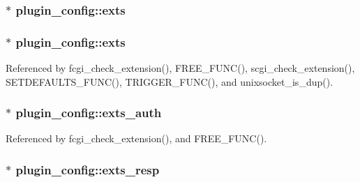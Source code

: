 \hypertarget{structplugin__config_a3c99102cf9e1d5708770d15369a08345}{
\subsubsection[{exts}]{$\ast$ plugin\-\_\-config\-::exts}}\label{structplugin__config_a3c99102cf9e1d5708770d15369a08345}
\hypertarget{structplugin__config_a4cbbd40f15c0c67bb1a2baf2ee1ed25d}{
\subsubsection[{exts}]{$\ast$ plugin\-\_\-config\-::exts}}\label{structplugin__config_a4cbbd40f15c0c67bb1a2baf2ee1ed25d}


Referenced by fcgi\-\_\-check\-\_\-extension(), F\-R\-E\-E\-\_\-\-F\-U\-N\-C(), scgi\-\_\-check\-\_\-extension(), S\-E\-T\-D\-E\-F\-A\-U\-L\-T\-S\-\_\-\-F\-U\-N\-C(), T\-R\-I\-G\-G\-E\-R\-\_\-\-F\-U\-N\-C(), and unixsocket\-\_\-is\-\_\-dup().

\hypertarget{structplugin__config_a940622b14c8268283bdc21ba4823cd4b}{
\subsubsection[{exts\-\_\-auth}]{$\ast$ plugin\-\_\-config\-::exts\-\_\-auth}}\label{structplugin__config_a940622b14c8268283bdc21ba4823cd4b}


Referenced by fcgi\-\_\-check\-\_\-extension(), and F\-R\-E\-E\-\_\-\-F\-U\-N\-C().

\hypertarget{structplugin__config_a2ce6e9fedec27481ec7b01f87a0a971c}{
\subsubsection[{exts\-\_\-resp}]{$\ast$ plugin\-\_\-config\-::exts\-\_\-resp}}\label{structplugin__config_a2ce6e9fedec27481ec7b01f87a0a971c}



